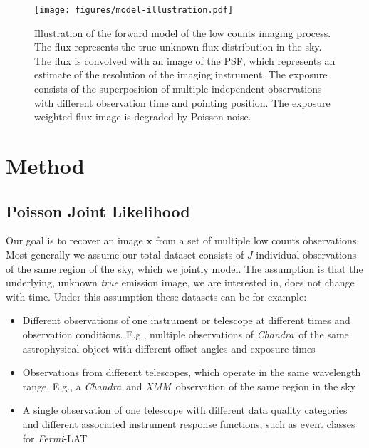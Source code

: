 \documentclass[twocolumn]{aastex631}
\newcommand{\chandra}{\textit{Chandra}~}
\newcommand{\xmm}{\textit{XMM}~}
\newcommand{\fermi}{\textit{Fermi}-LAT~}
\begin{document}
\begin{figure*}
        \begin{centering}
            \texttt{[image: figures/model-illustration.pdf]}
            \caption{
                Illustration of the forward model of the low counts imaging process. The flux represents the true unknown flux distribution in the sky. The flux is convolved with an image of the PSF, which represents an estimate of the resolution of the imaging instrument. The exposure consists of the superposition of multiple independent observations with different observation time and pointing position. The exposure weighted flux image is degraded by Poisson noise.
            }
            \label{fig:model-illustration}
        \end{centering}
    \end{figure*}
    \section{Method}
    
    \subsection{Poisson Joint Likelihood}
    Our goal is to recover an image $\mathbf{x}$ from a set of multiple low counts observations. Most generally we assume our total dataset consists of $J$ individual observations of the same region of the sky, which we jointly model. The assumption is that the underlying, unknown \textit{true} emission image, we are interested in, does not change with time. Under this assumption these datasets can be for example:

    \begin{itemize}
        \item Different observations of one instrument or telescope at different times and observation conditions. E.g., multiple observations of \chandra of the same astrophysical object with different offset angles and exposure times
        \item Observations from different telescopes, which operate in the same wavelength range. E.g., a \chandra and \xmm observation of the same region in the sky
        \item A single observation of one telescope with different data quality categories and different associated instrument response functions, such as event classes for \fermi
    \end{itemize}
\end{document}
